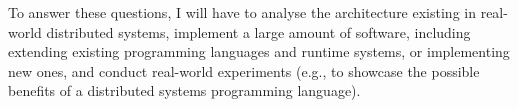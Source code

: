 To answer these questions, I will have to analyse the architecture
existing in real-world distributed systems, implement a large amount
of software, including extending existing programming languages and
runtime systems, or implementing new ones, and conduct real-world
experiments (e.g., to showcase the possible benefits of a distributed
systems programming language).
